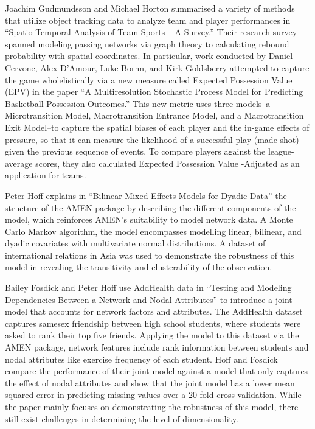 \documentclass[12pt,twoside]{dukestatscithesis}
\theoremstyle{definition}
\theoremstyle{definition}
\theoremstyle{definition}
\theoremstyle{remark}
\begin{document}
Joachim Gudmundsson and Michael Horton summarised a variety of methods
that utilize object tracking data to analyze team and player
performances in ``Spatio-Temporal Analysis of Team Sports -- A Survey.''
Their research survey spanned modeling passing networks via graph theory
to calculating rebound probability with spatial coordinates. In
particular, work conducted by Daniel Cervone, Alex D'Amour, Luke Bornn,
and Kirk Goldsberry attempted to capture the game wholelistically via a
new measure called Expected Possession Value (EPV) in the paper ``A
Multiresolution Stochastic Process Model for Predicting Basketball
Possession Outcomes.'' This new metric uses three models--a
Microtransition Model, Macrotransition Entrance Model, and a
Macrotransition Exit Model--to capture the spatial biases of each player
and the in-game effects of pressure, so that it can measure the
likelihood of a successful play (made shot) given the previous sequence
of events. To compare players against the league-average scores, they
also calculated Expected Possession Value -Adjusted as an application
for teams.

Peter Hoff explains in ``Bilinear Mixed Effects Models for Dyadic Data''
the structure of the AMEN package by describing the different components
of the model, which reinforces AMEN's suitability to model network data.
A Monte Carlo Markov algorithm, the model encompasses modelling linear,
bilinear, and dyadic covariates with multivariate normal distributions.
A dataset of international relations in Asia was used to demonstrate the
robustness of this model in revealing the transitivity and
clusterability of the observation.

Bailey Fosdick and Peter Hoff use AddHealth data in ``Testing and
Modeling Dependencies Between a Network and Nodal Attributes'' to
introduce a joint model that accounts for network factors and
attributes. The AddHealth dataset captures samesex friendship between
high school students, where students were asked to rank their top five
friends. Applying the model to this dataset via the AMEN package,
network features include rank information between students and nodal
attributes like exercise frequency of each student. Hoff and Fosdick
compare the performance of their joint model against a model that only
captures the effect of nodal attributes and show that the joint model
has a lower mean squared error in predicting missing values over a
20-fold cross validation. While the paper mainly focuses on
demonstrating the robustness of this model, there still exist challenges
in determining the level of dimensionality.
\end{document}
